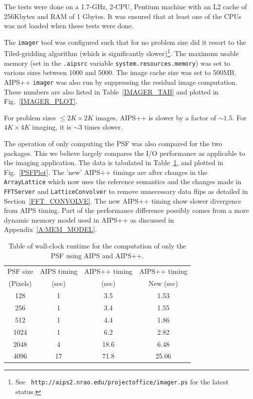 The tests were done on a 1.7-GHz, 2-CPU, Pentium machine with an L2
cache of 256Kbytes and RAM of 1 Gbytes.  It was ensured that at least
one of the CPUs was not loaded when these tests were done.

The {\tt imager} tool was configured such that for no problem size did
it resort to the Tiled-gridding algorithm (which is significantly
slower)\footnote{See {\tt
http://aips2.nrao.edu/projectoffice/imager.ps} for the latest
status.}.  The maximum usable memory (set in the {\tt .aipsrc}
variable {\tt system.resources.memory}) was set to various sizes
between 1000 and 5000.  The image cache size was set to 500MB.  AIPS++
{\tt imager} was also run by suppressing the residual image
computation.  These numbers are also listed in Table~\ref{IMAGER_TAB}
and plotted in Fig.~\ref{IMAGER_PLOT}.

For problem sizes $\le 2K\times2K$ images, AIPS++ is slower by a
factor of $\sim 1.5$.  For $4K\times4K$ imaging, it is $\sim 3$ times
slower.

The operation of only computing the PSF was also compared for the two
packages.  This we believe largely compares the I/O performance as
applicable to the imaging application.  The data is tabulated in
Table~\ref{PSFTime}, and plotted in Fig.~\ref{PSFPlot}.  The 'new'
AIPS++ timings are after changes in the {\tt ArrayLattice} which now
uses the reference semantics and the changes made in {\tt FFTServer}
and {\tt LatticeConvolver} to remove unnecessary data flips as
detailed in Section~\ref{FFT_CONVOLVE}.  The new AIPS++ timing show
slower divergence from AIPS timing.  Part of the performance
difference possibly comes from a more dynamic memory model used in
AIPS++ as discussed in Appendix~\ref{A:MEM_MODEL}.

\begin{table}[th!]
\begin{center}
\caption{\small Table of wall-clock runtime for the computation of only the
PSF using AIPS and AIPS++.}
\label{PSFTime}
\vskip 0.5cm
\begin{tabular}{|c|c|c|c|}
\hline
PSF size & AIPS timing & AIPS++ timing & AIPS++ timing\\
(Pixels) & (sec)        & (sec)        & New (sec) \\
\hline
128      &  1           &  3.5         & 1.53 \\
256      &  1           &  3.4         & 1.55 \\
512      &  1           &  4.4         & 1.86 \\
1024     &  1           &  6.2         & 2.82 \\
2048     &  4           &  18.6        & 6.48 \\
4096     &  17          &  71.8        & 25.06 \\
\hline
\end{tabular}
\end{center}
\end{table}

